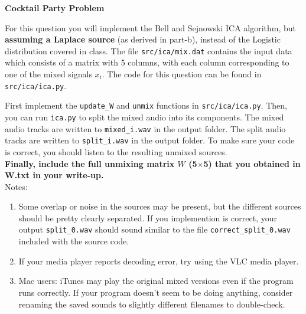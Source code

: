 \item {} \textbf{Cocktail Party Problem}

For this question you will implement the Bell and Sejnowski ICA algorithm, but
\textbf{assuming a Laplace source} (as derived in part-b), instead of the Logistic distribution
covered in class. The file \texttt{src/ica/mix.dat} contains the input data which consists of a matrix
with 5 columns, with each column corresponding to one of the mixed signals
$x_i$. The code for this question can be found in \texttt{src/ica/ica.py}.

First implement the \texttt{update\_W} and \texttt{unmix} functions in \texttt{src/ica/ica.py}. Then, you can run \texttt{ica.py} to split the mixed audio into its components. The mixed audio tracks are written to \texttt{mixed\_i.wav} in the output folder. The split audio tracks are written to \texttt{split\_i.wav} in the output folder. To make sure your code is correct, you should listen to the resulting unmixed sources. \\
\textbf{Finally, include the full unmixing matrix $W$ (5$\times$5) that you obtained in W.txt in your write-up.}\\
Notes:
\begin{enumerate}
  \item  Some overlap or noise in the sources may be present, but the different sources should be pretty clearly separated. If you implemention is correct, your output \texttt{split\_0.wav} should sound similar to the file \texttt{correct\_split\_0.wav} included with the source code.
  \item If your media player reports decoding error, try using the VLC media player.
  \item Mac users: iTunes may play the original mixed versions even if the program runs correctly. If your program doesn’t seem to be doing anything, consider renaming the saved sounds to slightly different filenames to double-check.
\end{enumerate}







